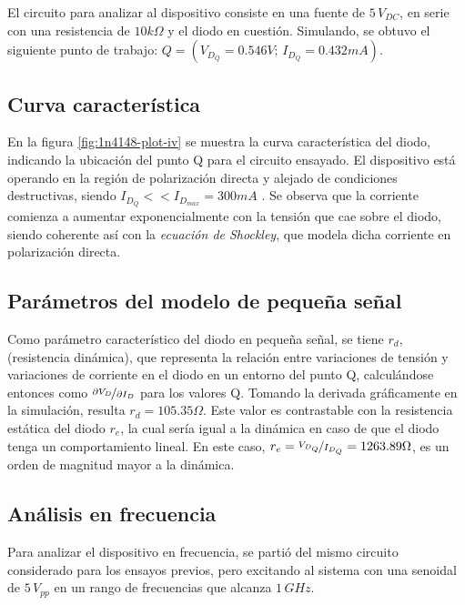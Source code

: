 \documentclass[../main.tex]{subfiles}
\begin{document}
El circuito para analizar al dispositivo consiste en una fuente de $5\,V_{DC}$, en serie con una resistencia de $10k\Omega$ y el diodo en cuestión. Simulando, se obtuvo el siguiente punto de trabajo: $Q = (V_{D_Q}=0.546V;\, I_{D_Q}=0.432mA)$.

\subsection{Curva característica}

En la figura \ref{fig:1n4148-plot-iv} se muestra la curva característica del diodo, indicando la ubicación del punto Q para el circuito ensayado. El dispositivo está operando en la región de polarización directa y alejado de condiciones destructivas, siendo $I_{D_Q} << I_{D_{max}} = 300mA$ \cite{1n4148}. Se observa que la corriente comienza a aumentar exponencialmente con la tensión que cae sobre el diodo, siendo coherente así con la \emph{ecuación de Shockley}, que modela dicha corriente en polarización directa.



\subsection{Parámetros del modelo de pequeña señal}

Como parámetro característico del diodo en pequeña señal, se tiene $r_d$, (resistencia dinámica), que representa la relación entre variaciones de tensión y variaciones de corriente en el diodo en un entorno del punto Q, calculándose entonces como $\nicefrac{\partial V_D}{\partial I_D}$ para los valores Q. Tomando la derivada gráficamente en la simulación, resulta $r_d = 105.35\Omega$. Este valor es contrastable con la resistencia estática del diodo $r_e$, la cual sería igual a la dinámica en caso de que el diodo tenga un comportamiento lineal. En este caso, $r_e = \nicefrac{V_{D_Q}}{I_{D_Q}} = 1263.89\Omega$, es un orden de magnitud mayor a la dinámica. 

\subsection{Análisis en frecuencia}
Para analizar el dispositivo en frecuencia, se partió del mismo circuito considerado para los ensayos previos, pero excitando al sistema con una senoidal de $5\,V_{pp}$ en un rango de frecuencias que alcanza $1\,GHz$.


\end{document}
